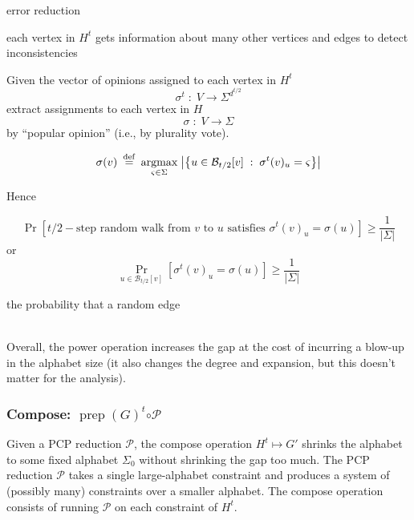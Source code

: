 \documentclass{article}
\newenvironment{proof_intuition}{\noindent {\bf Proof Intuition:}
	\hspace*{1mm}}{\hspace*{\fill} $\Box$ }
\newcommand{\argmax}[1]{\underset{#1}{\operatorname{argmax}}}
\newcommand{\prep}{{\operatorname{prep}}}
\newcommand{\eqdef}{\mathbin{\stackrel{\rm def}{=}}}
\begin{document}
\begin{proof_intuition}
error reduction

each vertex in $H^t$ gets information about many other vertices and
edges to detect inconsistencies

Given the vector of opinions assigned to each vertex in $H^t$
$$
\sigma^t \;:\; V \to \Sigma^{d^{t/2}}
$$
extract assignments to each vertex in $H$
$$
\sigma \;:\; V \to \Sigma
$$
by ``popular opinion'' (i.e., by plurality vote).

$$
\sigma(v) \;\eqdef\; \argmax{\varsigma \in \Sigma} \; \big| \big\{u \in \mathcal{B}_{t/2}[v] \;:\; \sigma^t(v)_u = \varsigma \big\}\big|
$$

Hence

$$
\Pr[t/2-\text{step random walk from $v$ to $u$ satisfies }\sigma^t(v)_u = \sigma(u)] \ge \frac{1}{|\Sigma|}
$$
or
$$
\Pr_{u \in \mathcal{B}_{t/2}[v]}[\sigma^t(v)_u = \sigma(u)] \ge \frac{1}{|\Sigma|}
$$

the probability that a random edge 

\end{proof_intuition}\\

Overall, the power operation increases the gap at the cost of incurring
a blow-up in the alphabet size (it also changes the degree and expansion,
but this doesn't matter for the analysis).

\subsubsection*{Compose: $\prep(G)^t \boldsymbol{\circ \mathcal{P}}$}

Given a PCP reduction $\mathcal{P}$, the compose operation $H^t \mapsto G'$
shrinks the alphabet to some fixed alphabet $\Sigma_0$ without shrinking the
gap too much.
The PCP reduction $\mathcal{P}$ takes a single large-alphabet constraint and
produces a system of (possibly many) constraints over a smaller alphabet.
The compose operation consists of running $\mathcal{P}$ on each constraint
of $H^t$.
%
%
%
\newpage



\end{document}
